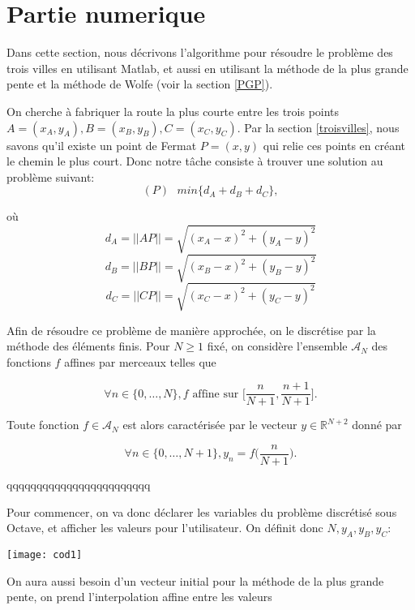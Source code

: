 \documentclass[10pt,a4paper]{article}%
\theoremstyle{theorem}
\theoremstyle{definition}
\begin{document}
	\section{Partie numerique}
	
	Dans cette section, nous décrivons l'algorithme pour résoudre le problème des trois villes en utilisant Matlab, et aussi en utilisant la méthode de la plus grande pente et la méthode de Wolfe (voir la section \ref{PGP}).
	
	On cherche à fabriquer la route la plus courte entre les trois points $A=(x_A,y_A), B=(x_B,y_B), C=(x_C,y_C)$. Par la section \ref{troisvilles}, nous savons qu'il existe un point de Fermat $P=(x,y)$ qui relie ces points en créant le chemin le plus court.
	Donc notre tâche consiste à trouver une solution au problème suivant:
	\[(P) \text{       } min\{d_A+d_B+d_C\},\]
	
	où
	 \[d_A=||AP||=\sqrt{(x_A-x)^2+(y_A-y)^2}\]
	 \[d_B=||BP||=\sqrt{(x_B-x)^2+(y_B-y)^2}\]
	 \[d_C=||CP||=\sqrt{(x_C-x)^2+(y_C-y)^2}\]
	 
	 Afin de résoudre ce problème de manière approchée, on le discrétise par la méthode des éléments finis. Pour $N\ge 1$ fixé, on considère l'ensemble $\mathcal{A}_N$ des fonctions $f$ affines par merceaux telles que 
	 
	 \[\forall n \in \{0,\dots, N\}, f \text{ affine sur } \bigg[\frac{n}{N+1},\frac{n+1}{N+1}\bigg]. \]
	 
	 Toute fonction $f\in \mathcal{A}_N$ est alors caractérisée par le vecteur $y \in \mathbb{R}^{N+2}$  donné par
	 
	 \[\forall n \in \{0,\dots, N+1\}, y_n=f\bigg(\frac{n}{N+1}\bigg).\] 
	 
	 qqqqqqqqqqqqqqqqqqqqqqqq
	 
	 Pour commencer, on va donc déclarer les variables du problème discrétisé sous Octave, et afficher les valeurs pour l'utilisateur. On définit donc $N,y_A,y_B,y_C$:
	 
	 \begin{center}
	 	\texttt{[image: cod1]}
	 \end{center}
	
	On aura aussi besoin d'un vecteur initial pour la méthode de la plus grande pente, on prend l'interpolation affine entre les valeurs 
	
	
	
		
		         
		         
		         
	        
	        
        
       
   		
        
\end{document}
